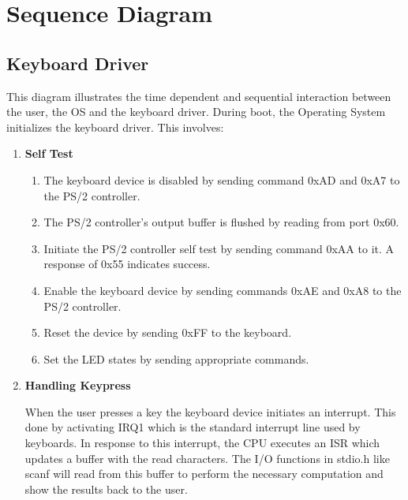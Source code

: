 \clearpage

\section{Sequence Diagram}

\subsection{Keyboard Driver}
\begin{flushleft}
	This diagram illustrates the time dependent and sequential interaction between the
	user, the OS and the keyboard driver.
	During boot, the Operating System initializes the keyboard driver.
	This involves:
	\begin{enumerate}
		\item \textbf{Self Test}
		\begin{enumerate}
			\item The keyboard device is disabled by sending command 0xAD and 0xA7 to
			the PS/2 controller.
			\item The PS/2 controller's output buffer is flushed by reading from port 0x60.
			\item Initiate the PS/2 controller self test by sending command 0xAA to it. A
			response of 0x55 indicates success.
			\item Enable the keyboard device by sending commands 0xAE and 0xA8 to the
			PS/2 controller.
			\item Reset the device by sending 0xFF to the keyboard.
			\item Set the LED states by sending appropriate commands.
		\end{enumerate}
		\item \textbf{Handling Keypress}
		
		When the user presses a key the keyboard device initiates an interrupt. This done by
		activating IRQ1 which is the standard interrupt line used by keyboards. In response
		to this interrupt, the CPU executes an ISR which updates a buffer with the read
		characters. The I/O functions in stdio.h like scanf will read from this buffer to perform
		the necessary computation and show the results back to the user.
		
	\end{enumerate}
\end{flushleft}
